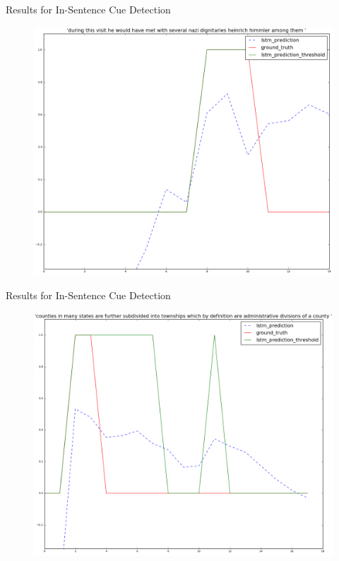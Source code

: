 \documentclass{beamer}
\begin{document}
\begin{frame}{Results for In-Sentence Cue Detection}
	\begin{figure}[htbp]
		\includegraphics[scale=0.3]{images/task2_1dir/78_type1}
	\end{figure}
\end{frame}
\begin{frame}{Results for In-Sentence Cue Detection}
	\begin{figure}[htbp]
		\includegraphics[scale=0.3]{images/task2_1dir/85_type1}
	\end{figure}
\end{frame}
\end{document}
